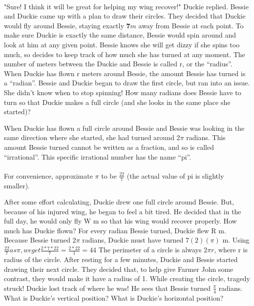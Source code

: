 \paragraph{} "Sure! I think it will be great for helping my wing recover!" Duckie replied.
\vfill
\pagebreak
{}
{Bessie and Duckie came up with a plan to draw their circles. They decided that Duckie would fly around Bessie, staying exactly $\mathbf{7} m$ away from Bessie at each point. To make sure Duckie is exactly the same distance, Bessie would spin around and look at him at any given point. Bessie knows she will get dizzy if she spins too much, so decides to keep track of how much she has turned at any moment.}
{}
{The number of meters between the Duckie and Bessie is called r, or the “radius”. When Duckie has flown r meters around Bessie, the amount Bessie has turned is a “radian”.}
{}
{Bessie and Duckie began to draw the first circle, but ran into an issue. She didn't know when to stop spinning! How many radians does Bessie have to turn so that Duckie makes a full circle (and she looks in the same place she started)?}
{}
{When Duckie has flown a full circle around Bessie and Bessie was looking in the same direction where she started, she had turned around 2$\pi$ radians. This amount Bessie turned cannot be written as a fraction, and so is called “irrational”. This specific irrational number has the name “pi”. 
\paragraph{} For convenience, approximate $\pi$ to be $\frac{22}{7}$ (the actual value of pi is slightly smaller).}
{}
{After some effort calculating, Duckie drew one full circle around Bessie. But, because of his injured wing, he began to feel a bit tired. He decided that in the full day, he would only fly W m so that his wing would recover properly. How much has Duckie flown?}
{For every radian Bessie turned, Duckie flew R m. Because Bessie turned 2$\pi$ radians, Duckie must have turned $7(2)(\pi) $ m. Using $\frac{22}{7} as \pi, we get \frac{2*7*22}{7}=\frac{2*22}{1}=44$}
{The perimeter of a circle is always $2\pi r$, where r is radius of the circle.}
{}
{After resting for a few minutes, Duckie and Bessie started drawing their next circle. They decided that, to help give Farmer John some contrast, they would make it have a radius of 1. While creating the circle, tragedy struck! Duckie lost track of where he was! He sees that Bessie turned $\frac{\pi}{4}$ radians. What is Duckie's vertical position? What is Duckie's horizontal position?}
